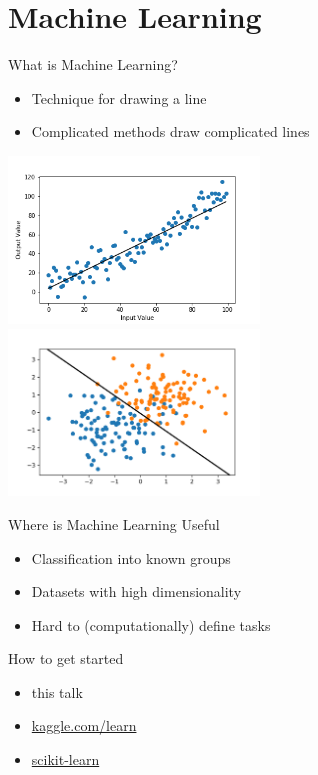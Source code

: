 \documentclass[aspectratio=169, 14pt]{beamer}
\begin{document}
\section{Machine Learning}
\begin{frame}{What is Machine Learning?}

  \begin{itemize}
    \item Technique for drawing a line
    \item Complicated methods draw complicated lines
  \end{itemize}

  \includegraphics[width=0.5\textwidth]{drawing_lines_regression.png}
  \includegraphics[width=0.5\textwidth]{drawing_lines_classification.png}

\end{frame}

\begin{frame}{Where is Machine Learning Useful}

  \begin{itemize}
    \item Classification into known groups
    \item Datasets with high dimensionality
    \item Hard to (computationally) define tasks
  \end{itemize}

\end{frame}

\begin{frame}{How to get started}

  \begin{itemize}
    \item this talk
    \item \url{kaggle.com/learn}
    \item \href{http://scikit-learn.org/stable/index.html}{scikit-learn}
  \end{itemize}

\end{frame}
\end{document}
